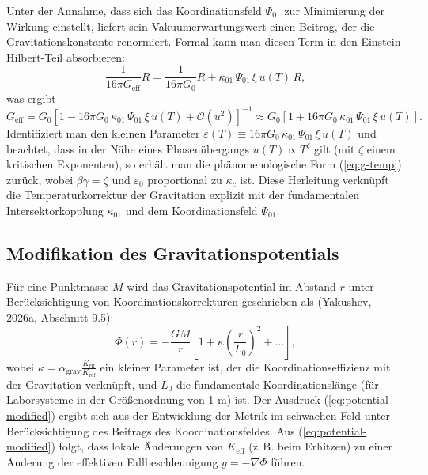 \documentclass[12pt]{article}
\theoremstyle{remark}
\newcommand{\Keff}{K_{\mathrm{eff}}}
\newcommand{\eps}{\varepsilon}
\newcommand{\kappac}{\kappa_c}
\begin{document}
	Unter der Annahme, dass sich das Koordinationsfeld $\Psi_{01}$ zur Minimierung der Wirkung einstellt, liefert sein Vakuumerwartungswert einen Beitrag, der die Gravitationskonstante renormiert. Formal kann man diesen Term in den Einstein-Hilbert-Teil absorbieren:
	\begin{equation}
		\frac{1}{16\pi G_{\text{eff}}} R = \frac{1}{16\pi G_0} R + \kappa_{01} \, \Psi_{01} \, \xi \, u(T) \, R,
	\end{equation}
	was ergibt
	\begin{equation}
		G_{\text{eff}} = G_0 \left[ 1 - 16\pi G_0 \, \kappa_{01} \, \Psi_{01} \, \xi \, u(T) + \mathcal{O}(u^2) \right]^{-1} \approx G_0 \left[ 1 + 16\pi G_0 \, \kappa_{01} \, \Psi_{01} \, \xi \, u(T) \right].
	\end{equation}
	Identifiziert man den kleinen Parameter $\eps(T) \equiv 16\pi G_0 \, \kappa_{01} \, \Psi_{01} \, \xi \, u(T)$ und beachtet, dass in der Nähe eines Phasenübergangs $u(T) \propto T^{\zeta}$ gilt (mit $\zeta$ einem kritischen Exponenten), so erhält man die phänomenologische Form (\ref{eq:g-temp}) zurück, wobei $\beta\gamma = \zeta$ und $\eps_0$ proportional zu $\kappac$ ist. Diese Herleitung verknüpft die Temperaturkorrektur der Gravitation explizit mit der fundamentalen Intersektorkopplung $\kappa_{01}$ und dem Koordinationsfeld $\Psi_{01}$.
	
	\subsection{Modifikation des Gravitationspotentials}
	\label{subsec:potential}
	
	Für eine Punktmasse $M$ wird das Gravitationspotential im Abstand $r$ unter Berücksichtigung von Koordinationskorrekturen geschrieben als (Yakushev, 2026a, Abschnitt 9.5):
	\begin{equation}
		\Phi(r) = -\frac{GM}{r} \left[ 1 + \kappa \left( \frac{r}{L_0} \right)^2 + \dots \right],
		\label{eq:potential-modified}
	\end{equation}
	wobei $\kappa = \alpha_{\text{grav}} \frac{\Keff}{K_{\text{ref}}}$ ein kleiner Parameter ist, der die Koordinationseffizienz mit der Gravitation verknüpft, und $L_0$ die fundamentale Koordinationslänge (für Laborsysteme in der Größenordnung von 1 m) ist. Der Ausdruck (\ref{eq:potential-modified}) ergibt sich aus der Entwicklung der Metrik im schwachen Feld unter Berücksichtigung des Beitrags des Koordinationsfeldes. Aus (\ref{eq:potential-modified}) folgt, dass lokale Änderungen von $\Keff$ (z. B. beim Erhitzen) zu einer Änderung der effektiven Fallbeschleunigung $g = -\nabla \Phi$ führen.
	
\end{document}
